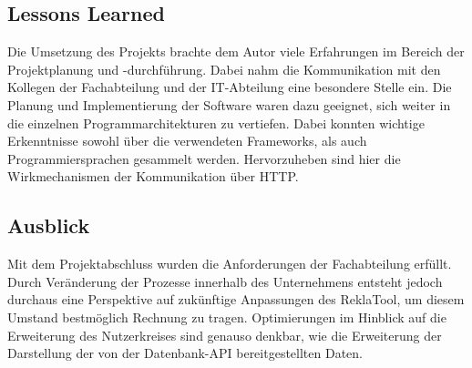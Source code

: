 \subsection{Lessons Learned}
\label{sec:LessonsLearned}
Die Umsetzung des Projekts brachte dem Autor viele Erfahrungen im Bereich der Projektplanung und -durchführung.
Dabei nahm die Kommunikation mit den Kollegen der Fachabteilung und der IT-Abteilung eine besondere Stelle ein.
Die Planung und Implementierung der Software waren dazu geeignet, sich weiter in die einzelnen Programmarchitekturen zu vertiefen.
Dabei konnten wichtige Erkenntnisse sowohl über die verwendeten Frameworks, als auch Programmiersprachen gesammelt werden.
Hervorzuheben sind hier die Wirkmechanismen der Kommunikation über \acs{HTTP}.

\subsection{Ausblick}
\label{sec:Ausblick}
Mit dem Projektabschluss wurden die Anforderungen der Fachabteilung erfüllt.
Durch Veränderung der Prozesse innerhalb des Unternehmens entsteht jedoch durchaus
eine Perspektive auf zukünftige Anpassungen des ReklaTool, um diesem Umstand bestmöglich
Rechnung zu tragen. Optimierungen im Hinblick auf die Erweiterung des Nutzerkreises
sind genauso denkbar, wie die Erweiterung der Darstellung der von der Datenbank-API bereitgestellten Daten.